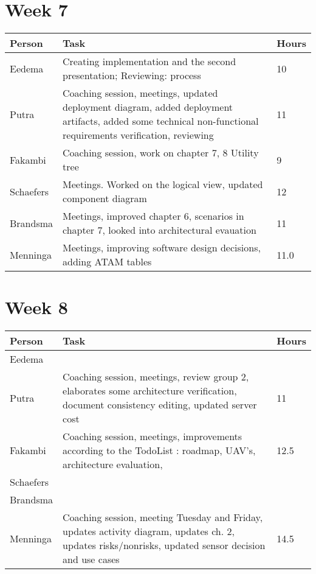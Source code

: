 \section{Week 7}
\begin{tabular}{p{} p{} p{}}
	\textbf{Person} & \textbf{Task}                                                                                                                  & \textbf{Hours} \\ \midrule
	Eedema          & Creating implementation and the second presentation; Reviewing: process& 10 \\ \midrule
	Putra           & Coaching session, meetings, updated deployment diagram, added deployment artifacts, added some technical non-functional requirements verification, reviewing & 11 \\ \midrule
	Fakambi         & Coaching session, work on chapter 7, 8 Utility tree & 9\\ \midrule
	Schaefers       & Meetings. Worked on the logical view, updated component diagram & 12 \\ \midrule
	Brandsma        & Meetings, improved chapter 6, scenarios in chapter 7, looked into architectural evauation & 11 \\ \midrule
	Menninga        & Meetings, improving software design decisions, adding ATAM tables                      &  11.0    \\
	\midrule
\end{tabular}

\section{Week 8}
\begin{tabular}{p{} p{} p{}}
	\textbf{Person} & \textbf{Task}                                                                                                                  & \textbf{Hours} \\ \midrule
	Eedema          & & \\ \midrule
	Putra           & Coaching session, meetings, review group 2, elaborates some architecture verification, document consistency editing, updated server cost & 11 \\ \midrule
	Fakambi         & Coaching session, meetings, improvements according to the TodoList : roadmap, UAV's, architecture evaluation, & 12.5\\ \midrule
	Schaefers       & & \\ \midrule
	Brandsma        & & \\ \midrule
	Menninga        & Coaching session, meeting Tuesday and Friday, updates activity diagram, updates ch. 2, updates risks/nonrisks, updated sensor decision and use cases & 14.5 \\
	\midrule
\end{tabular}